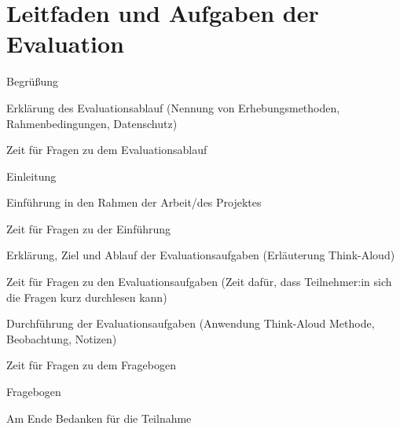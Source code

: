 \section{Leitfaden und Aufgaben der Evaluation}
\label{appendix:Evaluation}

\begin{compactenum}
    \item Begrüßung
    \item Erklärung des Evaluationsablauf (Nennung von Erhebungsmethoden, Rahmenbedingungen, Datenschutz)
    \item Zeit für Fragen zu dem Evaluationsablauf
    \item Einleitung
    \item Einführung in den Rahmen der Arbeit/des Projektes
    \item Zeit für Fragen zu der Einführung
    \item Erklärung, Ziel und Ablauf der Evaluationsaufgaben (Erläuterung Think-Aloud)
    \item Zeit für Fragen zu den Evaluationsaufgaben (Zeit dafür, dass Teilnehmer:in sich die Fragen kurz durchlesen kann)
    \item Durchführung der Evaluationsaufgaben (Anwendung Think-Aloud Methode, Beobachtung, Notizen)
    \item Zeit für Fragen zu dem Fragebogen
    \item Fragebogen
    \item Am Ende Bedanken für die Teilnahme
\end{compactenum}

